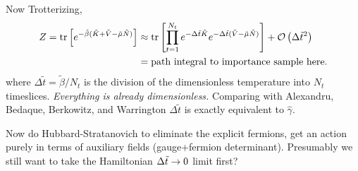 Now Trotterizing,
\begin{align}
	Z
	=
	\text{tr}\left[e^{-\tilde{\beta}(\tilde{K}+\tilde{V}-\tilde{\mu} \tilde{N})}\right]
	&\approx
	\text{tr}\left[\prod_{t=1}^{N_t} e^{-\Delta \tilde{t} \tilde{K}} e^{-\Delta\tilde{t}(\tilde{V}-\tilde{\mu}\tilde{N})}\right] + \mathcal{O}\left(\Delta\tilde{t}^2\right)
	\\
	&=
	\textrm{path integral to importance sample here.}
\end{align}
where $\Delta\tilde{t} = \tilde{\beta}/N_t$ is the division of the dimensionless temperature into $N_t$ timeslices.
\emph{Everything is already dimensionless.}
Comparing with Alexandru, Bedaque, Berkowitz, and Warrington $\Delta\tilde{t}$ is exactly equivalent to $\hat{\gamma}$.

Now do Hubbard-Stratanovich to eliminate the explicit fermions, get an action purely in terms of auxiliary fields (gauge+fermion determinant).
Presumably we still want to take the Hamiltonian $\Delta\tilde{t}\rightarrow0$ limit first?

